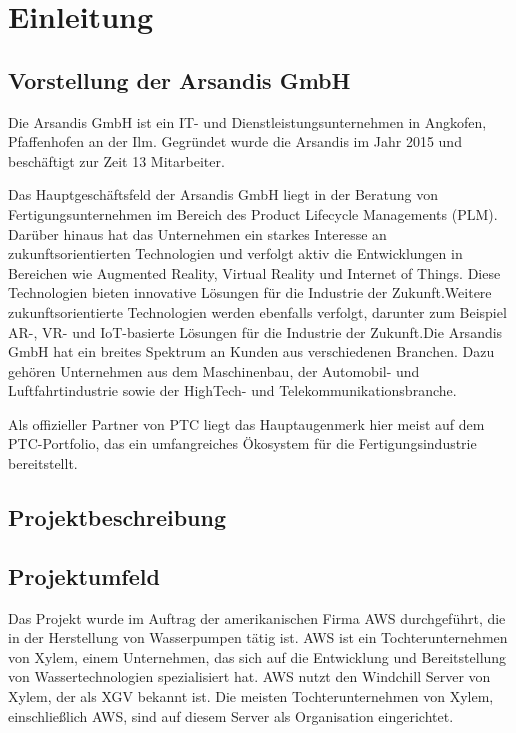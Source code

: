 \section{Einleitung}
\label{sec:Einleitung}

\subsection{Vorstellung der Arsandis GmbH}
\label{sec:Vorstellung_Arsandis}
Die Arsandis GmbH ist ein IT- und Dienstleistungsunternehmen in Angkofen, Pfaffenhofen an der Ilm.
Gegründet wurde die Arsandis im Jahr 2015 und beschäftigt zur Zeit 13 Mitarbeiter.

Das Hauptgeschäftsfeld der Arsandis GmbH liegt in der Beratung von Fertigungsunternehmen im Bereich des Product Lifecycle Managements (PLM).
Darüber hinaus hat das Unternehmen ein starkes Interesse an zukunftsorientierten Technologien und verfolgt aktiv die Entwicklungen in Bereichen wie Augmented Reality, Virtual Reality und Internet of Things.
Diese Technologien bieten innovative Lösungen für die Industrie der Zukunft.Weitere zukunftsorientierte Technologien werden ebenfalls verfolgt, darunter zum Beispiel AR-, VR- und IoT-basierte Lösungen für die Industrie der Zukunft.Die Arsandis GmbH hat ein breites Spektrum an Kunden aus verschiedenen Branchen.
Dazu gehören Unternehmen aus dem Maschinenbau, der Automobil- und Luftfahrtindustrie sowie der HighTech- und Telekommunikationsbranche.

Als offizieller Partner von PTC liegt das Hauptaugenmerk hier meist auf dem PTC-Portfolio, das ein umfangreiches Ökosystem für die Fertigungsindustrie bereitstellt.

\subsection{Projektbeschreibung}
\label{subsec:Projektbeschreibung}

\subsection{Projektumfeld}
\label{sec:Projektumfeld}
Das Projekt wurde im Auftrag der amerikanischen Firma \ac{AWS} durchgeführt, die in der Herstellung von Wasserpumpen tätig ist.
\ac{AWS} ist ein Tochterunternehmen von Xylem, einem Unternehmen, das sich auf die Entwicklung und Bereitstellung von Wassertechnologien spezialisiert hat.
\ac{AWS} nutzt den Windchill Server von Xylem, der als \ac{XGV} bekannt ist.
Die meisten Tochterunternehmen von Xylem, einschließlich \ac{AWS}, sind auf diesem Server als Organisation eingerichtet.

